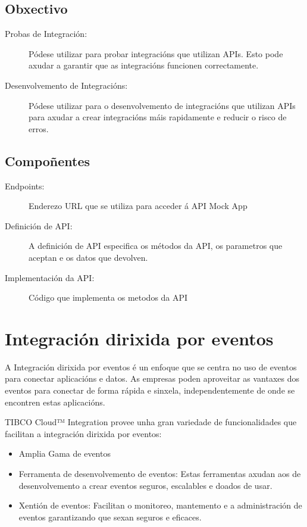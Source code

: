 \subsection{Obxectivo}

\begin{description}
    \item[Probas de Integración:] Pódese utilizar para probar integracións que utilizan APIs. Esto pode axudar a garantir que as integracións funcionen correctamente.
    \item[Desenvolvemento de Integracións:] Pódese utilizar para o desenvolvemento de integracións que utilizan APIs para axudar a crear integracións máis rapidamente e reducir o risco de erros.
\end{description}

\subsection{Compoñentes}

\begin{description}
    \item[Endpoints:] Enderezo URL que se utiliza para acceder á API Mock App
    \item[Definición de API:] A definición de API especifica os métodos da API, os parametros que aceptan e os datos que devolven.
    \item[Implementación da API:] Código que implementa os metodos da API
\end{description}

\section{Integración dirixida por eventos}

A Integración dirixida por eventos é un enfoque que se centra no uso de eventos para conectar aplicacións e datos. As empresas poden aproveitar as vantaxes dos eventos para conectar de forma rápida e sinxela, independentemente de onde se encontren estas aplicacións.

TIBCO Cloud™ Integration provee unha gran variedade de funcionalidades que facilitan a integración dirixida por eventos:

\begin{itemize}
    \item Amplia Gama de eventos
    \item Ferramenta de desenvolvemento de eventos: Estas ferramentas axudan aos de desenvolvemento a crear eventos seguros, escalables e doados de usar.
    \item Xentión de eventos: Facilitan o monitoreo, mantemento e a administración de eventos garantizando que sexan seguros e eficaces.
\end{itemize}

